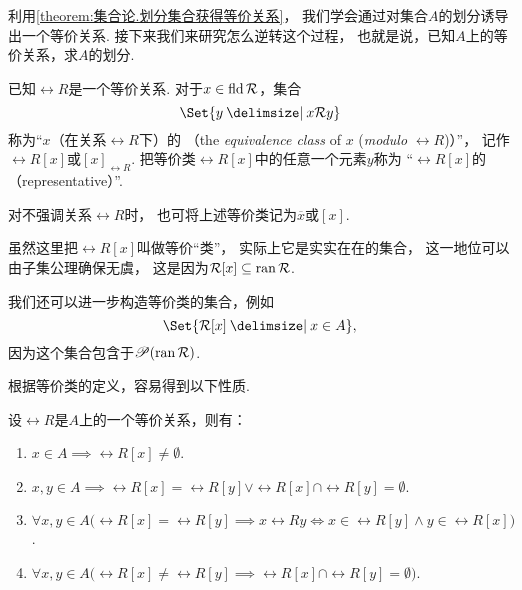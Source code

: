 利用\cref{theorem:集合论.划分集合获得等价关系}，
我们学会通过对集合\(A\)的划分诱导出一个等价关系.
接下来我们来研究怎么逆转这个过程，
也就是说，已知\(A\)上的等价关系，求\(A\)的划分.

\begin{definition}
已知\(\rel{R}\)是一个等价关系.
对于\(x \in \operatorname{fld} \mathcal{R}\)，集合\[
	\Set{ y \given x \rel{R} y }
\]
称为“\(x\)（在关系\(\rel{R}\)下）的%
（the \emph{equivalence class} of \(x\) (\emph{modulo} \(\rel{R}\))）”，
记作\(\rel{R}[x]\)或\([x]_{\rel{R}}\).
把等价类\(\rel{R}[x]\)中的任意一个元素\(y\)称为%
“\(\rel{R}[x]\)的（representative）”.

对不强调关系\(\rel{R}\)时，
也可将上述等价类记为\(\overline{x}\)或\([x]\).
\end{definition}

虽然这里把\(\rel{R}[x]\)叫做等价“类”，
实际上它是实实在在的集合，
这一地位可以由子集公理确保无虞，
这是因为\(\mathcal{R}[x] \subseteq \operatorname{ran} \mathcal{R}\).

我们还可以进一步构造等价类的集合，例如\[
	\Set{ \rel{R}[x] \given x \in A },
\]
因为这个集合包含于\(\mathscr{P}(\operatorname{ran} \mathcal{R})\).

根据等价类的定义，容易得到以下性质.
\begin{property}
设\(\rel{R}\)是\(A\)上的一个等价关系，则有：
\begin{enumerate}
	\item \(x \in A
	\implies \rel{R}[x] \neq \emptyset\).

	\item \(x,y \in A
	\implies \rel{R}[x] = \rel{R}[y]
	\lor \rel{R}[x] \cap \rel{R}[y] = \emptyset\).

	\item \(\forall x,y \in A \bigl( \rel{R}[x] = \rel{R}[y]
	\implies x \rel{R} y
	\iff x \in \rel{R}[y] \land y \in \rel{R}[x] \bigr)\).

	\item \(\forall x,y \in A \bigl( \rel{R}[x] \neq \rel{R}[y]
	\implies \rel{R}[x] \cap \rel{R}[y] = \emptyset \bigr)\).
\end{enumerate}
\end{property}


